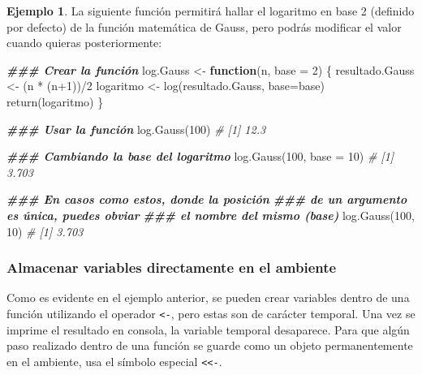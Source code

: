 \documentclass[
]{article}
\newenvironment{Shaded}{\begin{snugshade}}{\end{snugshade}}
\newcommand{\AttributeTok}[1]{\textcolor[rgb]{0.77,0.63,0.00}{#1}}
\newcommand{\CommentTok}[1]{\textcolor[rgb]{0.56,0.35,0.01}{\textit{#1}}}
\newcommand{\ControlFlowTok}[1]{\textcolor[rgb]{0.13,0.29,0.53}{\textbf{#1}}}
\newcommand{\DecValTok}[1]{\textcolor[rgb]{0.00,0.00,0.81}{#1}}
\newcommand{\DocumentationTok}[1]{\textcolor[rgb]{0.56,0.35,0.01}{\textbf{\textit{#1}}}}
\newcommand{\FunctionTok}[1]{\textcolor[rgb]{0.00,0.00,0.00}{#1}}
\newcommand{\NormalTok}[1]{#1}
\newcommand{\OtherTok}[1]{\textcolor[rgb]{0.56,0.35,0.01}{#1}}
\newcommand{\SpecialCharTok}[1]{\textcolor[rgb]{0.00,0.00,0.00}{#1}}
\theoremstyle{definition}
\theoremstyle{definition}
\newtheorem{example}{Ejemplo}[section]
\theoremstyle{definition}
\theoremstyle{definition}
\theoremstyle{remark}
\begin{document}
\begin{example}

La siguiente función permitirá hallar el logaritmo en base 2 (definido por defecto) de la función matemática de Gauss, pero podrás modificar el valor cuando quieras posteriormente:

\begin{Shaded}
\begin{Highlighting}[]
\DocumentationTok{\#\#\# Crear la función}
\NormalTok{log.Gauss }\OtherTok{\textless{}{-}} \ControlFlowTok{function}\NormalTok{(n, }\AttributeTok{base =} \DecValTok{2}\NormalTok{) \{}
\NormalTok{  resultado.Gauss }\OtherTok{\textless{}{-}}\NormalTok{ (n }\SpecialCharTok{*}\NormalTok{ (n}\SpecialCharTok{+}\DecValTok{1}\NormalTok{))}\SpecialCharTok{/}\DecValTok{2}
\NormalTok{  logaritmo }\OtherTok{\textless{}{-}} \FunctionTok{log}\NormalTok{(resultado.Gauss, }\AttributeTok{base=}\NormalTok{base)}
  \FunctionTok{return}\NormalTok{(logaritmo)}
\NormalTok{\}}

\DocumentationTok{\#\#\# Usar la función}
\FunctionTok{log.Gauss}\NormalTok{(}\DecValTok{100}\NormalTok{)}
\CommentTok{\# [1] 12.3}

\DocumentationTok{\#\#\# Cambiando la base del logaritmo}
\FunctionTok{log.Gauss}\NormalTok{(}\DecValTok{100}\NormalTok{, }\AttributeTok{base =} \DecValTok{10}\NormalTok{)}
\CommentTok{\# [1] 3.703}

\DocumentationTok{\#\#\# En casos como estos, donde la posición}
\DocumentationTok{\#\#\# de un argumento es única, puedes obviar}
\DocumentationTok{\#\#\# el nombre del mismo (base)}
\FunctionTok{log.Gauss}\NormalTok{(}\DecValTok{100}\NormalTok{, }\DecValTok{10}\NormalTok{)}
\CommentTok{\# [1] 3.703}
\end{Highlighting}
\end{Shaded}

\end{example}

\hypertarget{almacenar-variables-directamente-en-el-ambiente}{%
\subsubsection{Almacenar variables directamente en el ambiente}\label{almacenar-variables-directamente-en-el-ambiente}}

Como es evidente en el ejemplo anterior, se pueden crear variables dentro de una función utilizando el operador \texttt{\textless{}-}, pero estas son de carácter temporal. Una vez se imprime el resultado en consola, la variable temporal desaparece. Para que algún paso realizado dentro de una función se guarde como un objeto permanentemente en el ambiente, usa el símbolo especial \texttt{\textless{}\textless{}-}.
\end{document}
